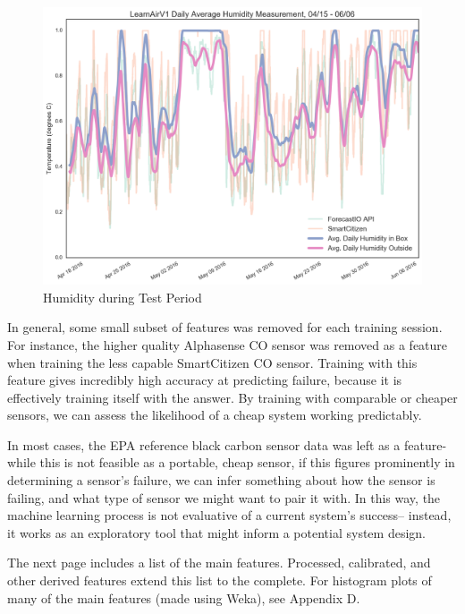 \begin{figure}[htb]
 	\includegraphics[width=\textwidth]{figs/humidity_daily}               
 	 \caption{Humidity during Test Period}
  	\label{fig:humidity_daily}
\end{figure}

In general, some small subset of features was removed for each training session.  For instance, the higher quality Alphasense CO sensor was removed as a feature when training the less capable SmartCitizen CO sensor.  Training with this feature gives incredibly high accuracy at predicting failure, because it is effectively training itself with the answer.  By training with comparable or cheaper sensors, we can assess the likelihood of a cheap system working predictably.

In most cases, the EPA reference black carbon sensor data was left as a feature- while this is not feasible as a portable, cheap sensor, if this figures prominently in determining a sensor's failure, we can infer something about how the sensor is failing, and what type of sensor we might want to pair it with.  In this way, the machine learning process is not evaluative of a current system's success-- instead, it works as an exploratory tool that might inform a potential system design.

The next page includes a list of the main features.  Processed, calibrated, and other derived features extend this list to the complete.  For histogram plots of many of the main features (made using Weka), see Appendix D.


